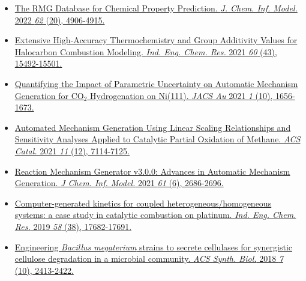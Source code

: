 \documentclass[10pt, line]{res}
\begin{document}
\begin{resume}
\begin{itemize}
    \item \href{https://doi.org/10.1021/acs.jcim.2c00965}{The RMG Database for Chemical Property Prediction.
    \textit{J. Chem. Inf. Model.} 2022 \textit{62} (20), 4906-4915.}
    \item \href{https://doi.org/10.1021/acs.iecr.1c03076}{Extensive High-Accuracy Thermochemistry and Group Additivity Values for Halocarbon Combustion Modeling. \textit{Ind. Eng. Chem. Res.} 2021 \textit{60} (43), 15492-15501.}
    \item \href{https://pubs.acs.org/doi/10.1021/jacsau.1c00276} {Quantifying the Impact of Parametric Uncertainty on Automatic Mechanism Generation for CO$_2$ Hydrogenation on Ni(111). \textit{JACS Au} 2021 \textit{1} (10), 1656-1673.}
    \item \href{https://doi.org/10.1021/acscatal.0c04100}{Automated Mechanism Generation Using Linear Scaling Relationships and Sensitivity Analyses Applied to Catalytic Partial Oxidation of Methane. \textit{ACS Catal.} 2021 \textit{11} (12), 7114-7125.}
    \item \href{https://doi.org/10.1021/acs.jcim.0c01480}{Reaction Mechanism Generator v3.0.0: Advances in Automatic Mechanism Generation. \textit{J Chem. Inf. Model.} 2021 \textit{61} (6), 2686-2696.}
    \item \href{https://doi.org/10.1021/acs.iecr.9b01464}{Computer-generated kinetics for coupled heterogeneous/homogeneous systems: a case study in catalytic combustion on platinum. \textit{Ind. Eng. Chem. Res.} 2019 \textit{58} (38), 17682-17691.}
    \item \href{https://doi.org/10.1021/acssynbio.8b00186}{Engineering \textit{Bacillus megaterium} strains to secrete cellulases for synergistic cellulose degradation in a microbial community. \textit{ACS Synth. Biol.} 2018 \textit{7} (10), 2413-2422.}
\end{itemize}




\end{resume}
\end{document}
